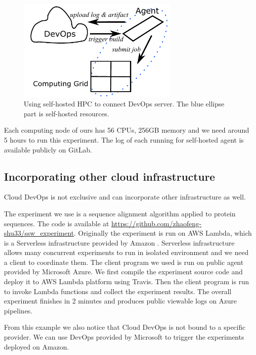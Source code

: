 \documentclass{IEEEcsmag}
\begin{document}
\begin{figure}[!ht]
\centerline{\includegraphics[width=18.5pc]{self-hosted.pdf}}
\caption{Using self-hosted HPC to connect DevOps server. The blue ellipse part is self-hosted resources.}\label{fig:selfhosted}
\end{figure}

Each computing node of ours has 56 CPUs, 256GB memory and we need around 5 hours to run this experiment. The log of each running for self-hosted agent is available publicly on GitLab.

\subsection{Incorporating other cloud infrastructure}
Cloud DevOps is not exclusive and can incorporate other infrastructure as well.  

The experiment we use is a sequence alignment algorithm applied to protein sequences. 
The code is available at \url{https://github.com/zhaofeng-shu33/ssw_experiment}. Originally the experiment is run on AWS Lambda, which is a Serverless infrastructure provided by Amazon \cite{niu2019leveraging}. Serverless infrastructure allows many concurrent experiments to run in isolated environment and
we need a client to coordinate them. The client program we used is run on public agent provided by Microsoft Azure. We first compile the experiment source code and deploy it to AWS Lambda platform using Travis. Then the client program is run to invoke Lambda functions and collect the experiment results.
The overall experiment finishes in 2 minutes and produces public viewable logs on Azure pipelines. 

From this example we also notice that Cloud DevOps is not bound to a specific provider. We can use DevOps provided by Microsoft to trigger the experiments deployed on Amazon.
\end{document}
